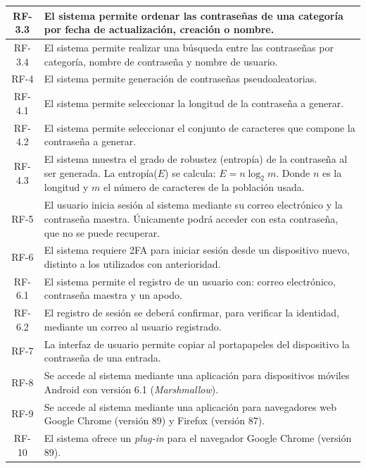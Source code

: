 \documentclass{article}
\begin{document}
\begin{table}[H]
\begin{tabular}{| c | p{30em} |}
        RF-3.3 & El sistema permite ordenar las contraseñas de una categoría por fecha de actualización, creación o nombre. \\ \hline
        RF-3.4 & El sistema permite realizar una búsqueda entre las contraseñas por categoría, nombre de contraseña y nombre de usuario.  \\ \hline
        RF-4 & El sistema permite generación de contraseñas pseudoaleatorias. \\ \hline
        RF-4.1 & El sistema permite seleccionar la longitud de la contraseña a generar.\\ \hline
        RF-4.2 & El sistema permite seleccionar el conjunto de caracteres que compone la contraseña a generar.\\ \hline
        RF-4.3 & El sistema muestra el grado de robustez (entropía) de la contraseña al ser generada. La entropía($E$) se calcula: $E=n\log_2m$. Donde $n$ es la longitud y $m$ el número de caracteres de la población usada.\\ \hline
        RF-5 & El usuario inicia sesión al sistema mediante su correo electrónico y la contraseña maestra. Únicamente podrá acceder con esta contraseña, que no se puede recuperar.\\ \hline
        RF-6 & El sistema requiere 2FA para iniciar sesión desde un dispositivo nuevo, distinto a los utilizados con anterioridad. \\ \hline
        RF-6.1 & El sistema permite el registro de un usuario con: correo electrónico, contraseña maestra y un apodo.\\ \hline 
        RF-6.2 & El registro de sesión se deberá confirmar, para verificar la identidad, mediante un correo al usuario registrado. \\ \hline
        RF-7 & La interfaz de usuario permite copiar al portapapeles del dispositivo la contraseña de una entrada. \\ \hline 
        RF-8 & Se accede al sistema mediante una aplicación para dispositivos móviles Android con versión 6.1 (\textit{Marshmallow}). \\ \hline
        RF-9 & Se accede al sistema mediante una aplicación para navegadores web Google Chrome (versión 89) y Firefox (versión 87). \\ \hline
        RF-10 & El sistema ofrece un \textit{plug-in} para el navegador Google Chrome (versión 89). \\ \hline
    \end{tabular}
\end{table}
\end{document}
